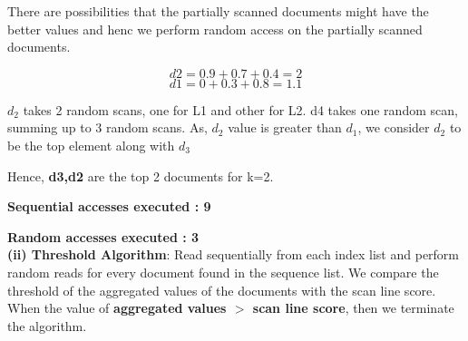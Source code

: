 There are possibilities that the partially scanned documents might have the better values and henc we perform random access on the partially scanned documents.

\[d2 = 0.9 + 0.7 + 0.4 = 2 \]  
\[d1 = 0 + 0.3 + 0.8 = 1.1 \] 

$d_2$ takes 2 random scans, one for L1 and other for L2. d4 takes one random scan, summing up to 3 random scans.
As, $d_2$ value is greater than $d_1$, we consider $d_2$ to be the top element along with $d_3$


Hence, \textbf{{d3,d2}} are the top 2 documents for k=2. 

\textbf{Sequential accesses executed : 9}

\textbf{Random accesses executed : 3}
\\

\textbf{(ii) Threshold Algorithm}:  Read sequentially from each index list and perform random reads for every document found in the sequence list. We compare the threshold of the aggregated values of the documents with the scan line score. When the value of \textbf{aggregated values $>$ scan line score}, then we terminate the algorithm.
\\
\\

